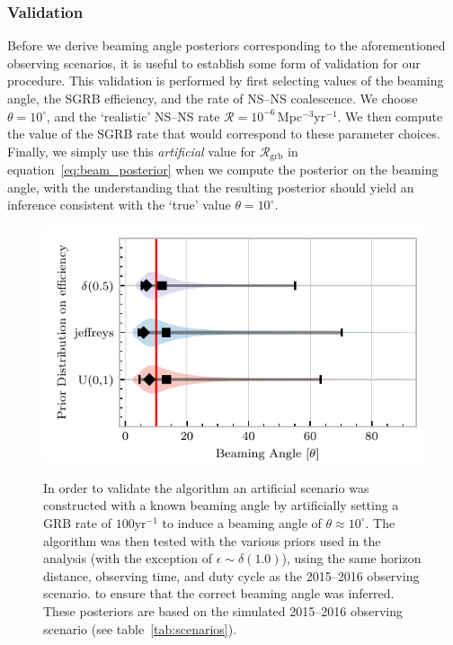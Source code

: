 \documentclass[twocolumn,nofootinbib]{revtex4-1}
\newcommand{\grbrate}{{{\mathcal R}_{\mathrm{grb}}}}
\newcommand{\cbcrate}{{{\mathcal R}}}
\newcommand{\yr}{\mathrm{yr}}
\newcommand{\BNS}{\ac{NS}--\ac{NS}\xspace}
\begin{document}
\subsubsection{Validation}
Before we derive beaming angle posteriors corresponding to the
aforementioned observing scenarios, it is useful to establish some
form of validation for our procedure.  This validation is performed by
first selecting values of the beaming angle, the \ac{SGRB} efficiency,
and the rate of \BNS coalescence.  We choose $\theta=10^{\circ}$, and
the `realistic' \BNS rate $\cbcrate = 10^{-6}$\,Mpc$^{-3}$yr$^{-1}$.
We then compute the value of the \ac{SGRB} rate that would correspond
to these parameter choices.  Finally, we simply use this
\emph{artificial} value for $\grbrate$ in
equation~\ref{eq:beam_posterior} when we compute the posterior on the
beaming angle, with the understanding that the resulting posterior
should yield an inference consistent with the `true' value
$\theta=10^{\circ}$.
%
\begin{figure}%
\centering
{\includegraphics[width=\linewidth]{O1_injections_violin.pdf}}
\caption{ In order to validate the algorithm an artificial scenario
  was constructed with a known beaming angle by artificially setting a
  GRB rate of $100 \yr^{-1}$ to induce a beaming angle of $\theta \approx 10^{\circ}$.
  The algorithm was then tested with the various priors used in the
  analysis (with the exception of $\epsilon \sim \delta(1.0)$), using
  the same horizon distance, observing time, and duty cycle as the 2015--2016
  observing scenario. to ensure that the correct beaming angle was inferred. 
  These posteriors are based on the simulated 2015--2016 observing scenario (see
  table~\ref{tab:scenarios}).
  \label{fig:injjetposterio2016}}
\end{figure}
\end{document}
